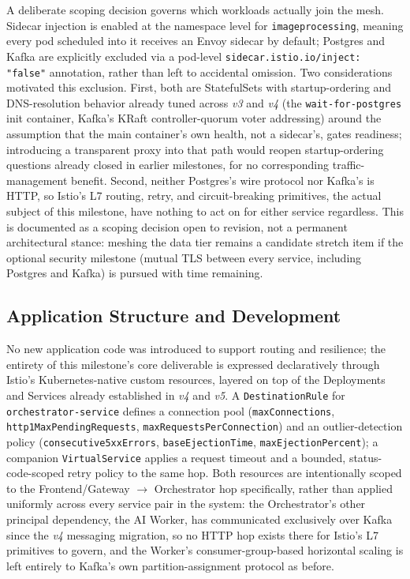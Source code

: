 \documentclass[twoside]{supsistudent}
\begin{document}
A deliberate scoping decision governs which workloads actually join the mesh. Sidecar injection is enabled at the namespace level for \texttt{imageprocessing}, meaning every pod scheduled into it receives an Envoy sidecar by default; Postgres and Kafka are explicitly excluded via a pod-level \texttt{sidecar.istio.io/inject: "false"} annotation, rather than left to accidental omission. Two considerations motivated this exclusion. First, both are StatefulSets with startup-ordering and DNS-resolution behavior already tuned across \emph{v3} and \emph{v4} (the \texttt{wait-for-postgres} init container, Kafka's KRaft controller-quorum voter addressing) around the assumption that the main container's own health, not a sidecar's, gates readiness; introducing a transparent proxy into that path would reopen startup-ordering questions already closed in earlier milestones, for no corresponding traffic-management benefit. Second, neither Postgres's wire protocol nor Kafka's is HTTP, so Istio's L7 routing, retry, and circuit-breaking primitives, the actual subject of this milestone, have nothing to act on for either service regardless. This is documented as a scoping decision open to revision, not a permanent architectural stance: meshing the data tier remains a candidate stretch item if the optional security milestone (mutual TLS between every service, including Postgres and Kafka) is pursued with time remaining.

\subsection{Application Structure and Development}
No new application code was introduced to support routing and resilience; the entirety of this milestone's core deliverable is expressed declaratively through Istio's Kubernetes-native custom resources, layered on top of the Deployments and Services already established in \emph{v4} and \emph{v5}. A \texttt{DestinationRule} for \texttt{orchestrator-service} defines a connection pool (\texttt{maxConnections}, \texttt{http1MaxPendingRequests}, \texttt{maxRequestsPerConnection}) and an outlier-detection policy (\texttt{consecutive5xxErrors}, \texttt{baseEjectionTime}, \texttt{maxEjectionPercent}); a companion \texttt{VirtualService} applies a request timeout and a bounded, status-code-scoped retry policy to the same hop. Both resources are intentionally scoped to the Frontend/Gateway \(\rightarrow\) Orchestrator hop specifically, rather than applied uniformly across every service pair in the system: the Orchestrator's other principal dependency, the AI Worker, has communicated exclusively over Kafka since the \emph{v4} messaging migration, so no HTTP hop exists there for Istio's L7 primitives to govern, and the Worker's consumer-group-based horizontal scaling is left entirely to Kafka's own partition-assignment protocol as before.
\end{document}
